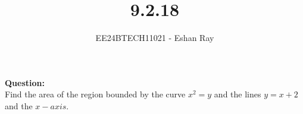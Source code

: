 \documentclass[journal]{IEEEtran}
\begin{document}

\vspace{3cm}

\title{9.2.18}
\author{EE24BTECH11021 - Eshan Ray}

{\let\newpage\relax\maketitle}

\renewcommand{\thefigure}{\theenumi}
\renewcommand{\thetable}{\theenumi}
\setlength{\intextsep}{10pt} %




\textbf{Question: }\\
Find the area of the region bounded by the curve $x^2 = y$ and the lines $y = x + 2$ and
the $x-axis$.\\
\end{document}
